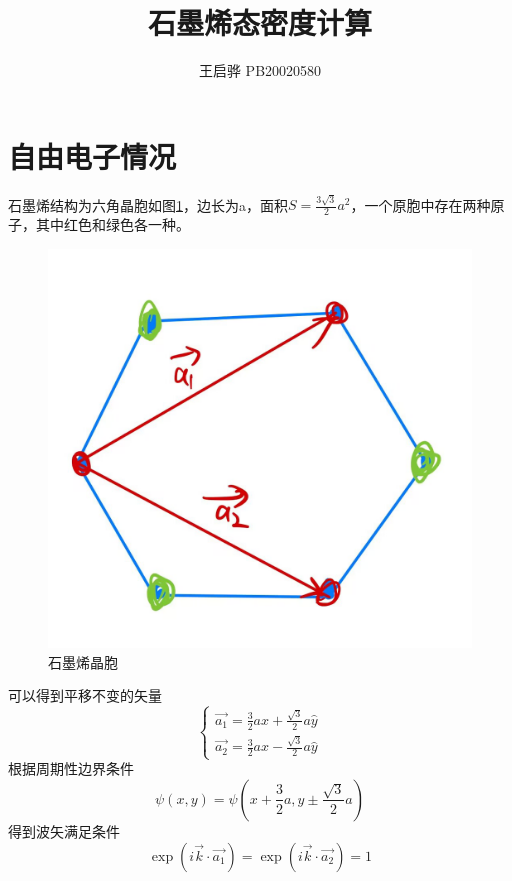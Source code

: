 \documentclass{article}
\title{\songti \zihao{2}\bfseries 石墨烯态密度计算}
\author{王启骅 PB20020580}
\begin{document}
	\maketitle
\section{自由电子情况}
石墨烯结构为六角晶胞如图\ref{fig:1}，边长为a，面积$ S=\frac{3\sqrt{3}}{2}a^2 $，一个原胞中存在两种原子，其中红色和绿色各一种。
	\begin{figure}[!h]
	
	\centering
	\includegraphics[scale=0.25]{晶胞}
	\caption{\heiti{}石墨烯晶胞}
	\label{fig:1}
\end{figure}
可以得到平移不变的矢量
\begin{equation}
	\begin{cases}
		\vec{a_1}=\frac{3}{2}a\hat{x}+\frac{\sqrt{3}}{2}a\hat{y}\\
		\vec{a_2}=\frac{3}{2}a\hat{x}-\frac{\sqrt{3}}{2}a\hat{y}
	\end{cases}
\end{equation}
根据周期性边界条件
\begin{equation}
		\psi(x,y)=\psi(x+\frac{3}{2}a,y\pm\frac{\sqrt{3}}{2}a)
\end{equation}
得到波矢满足条件
\begin{equation}
	\exp(i\vec{k}\cdot\vec{a_1})=\exp(i\vec{k}\cdot\vec{a_2})=1
\end{equation}
\end{document}
